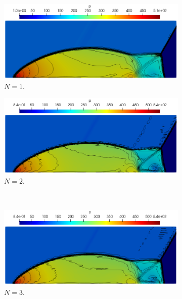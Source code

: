 \documentclass[a4paper,11pt,oneside]{article}
\begin{document}
\begin{figure}[htbp]
	\centering
	\begin{subfigure}{0.5\linewidth}
		\includegraphics[width=\linewidth]{figures/dmr/res_60_N1_chandrashekhar}
		\caption{$N=1$.}
		\label{subfig:dmr_result_N1}
	\end{subfigure}%
	\begin{subfigure}{0.5\linewidth}
		\includegraphics[width=\linewidth]{figures/dmr/res_60_N2_chandrashekhar}
		\caption{$N=2$.}
		\label{subfig:dmr_result_N2}
	\end{subfigure}\\
	\begin{subfigure}{0.5\linewidth}
		\includegraphics[width=\linewidth]{figures/dmr/res_60_N3_chandrashekhar}
		\caption{$N=3$.}
		\label{subfig:dmr_result_N3}
	\end{subfigure}%
	\begin{subfigure}{0.5\linewidth}

\end{subfigure}
\end{figure}
\end{document}
